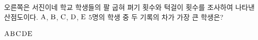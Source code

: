 \noindent\begin{minipage}[t]{0.58\linewidth}\vspace{0pt}\raggedright 오른쪽은 서진이네 학교 학생들의 팔 굽혀 펴기 횟수와 턱걸이 횟수를 조사하여 나타낸 산점도이다. $\mathrm{A}$, $\mathrm{B}$, $\mathrm{C}$, $\mathrm{D}$, $\mathrm{E}$ $5$명의 학생 중 두 기록의 차가 가장 큰 학생은?\end{minipage}\hfill\begin{minipage}[t]{0.4\linewidth}\vspace{0pt}\centering \resizebox{\ifdim\width>\linewidth\linewidth\else\width\fi}{!}{}\end{minipage}\par
\begin{choices32}{$\mathrm{A}$}{$\mathrm{B}$}{$\mathrm{C}$}{$\mathrm{D}$}{$\mathrm{E}$}\end{choices32}
